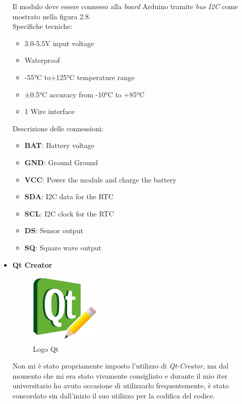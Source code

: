 \begin{itemize}
\begin{figure}[htbp]
\end{figure}
 
Il modulo deve essere connesso alla \textit{board} Arduino tramite \textit{bus I2C} come mostrato nella figura 2.8. \\

Specifiche tecniche:
\begin{itemize}
    \item 3.0-5.5V input voltage
    \item Waterproof
    \item -55°C to+125°C temperature range
    \item ±0.5°C accuracy from -10°C to +85°C
    \item 1 Wire interface


\end{itemize}



Descrizione delle connessioni:

\begin{itemize}
\item \textbf{BAT}: 	Battery voltage 	
\item \textbf{GND}:	Ground 	Ground
\item \textbf{VCC}: Power the module and charge the battery
\item \textbf{SDA}: 	I2C data for the RTC
\item \textbf{SCL}:   I2C clock for the RTC
\item \textbf{DS}: 	Sensor output 	
\item \textbf{SQ}: 	Square wave output 
\end{itemize}
	
	
\item \textbf{Qt Creator}\\
\begin{figure}[htbp]
\centering
\includegraphics[scale=.8]{./capitoli/capitolo2/img/qt}
\caption{Logo Qt}
\end{figure}
Non mi è stato propriamente imposto l'utilizzo di \textit{Qt-Creator}, ma dal momento che mi era stato vivamente consigliato e durante il mio iter universitario ho avuto occasione di utilizzarlo frequentemente, è stato concordato sin dall'inizio il suo utilizzo per la codifica del codice.
\end{itemize}

